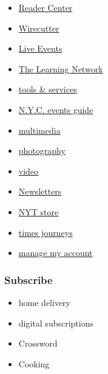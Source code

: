 \begin{itemize}
\tightlist
\item
  \href{https://web.archive.org/web/20200128165017/https://www.nytimes.com/section/reader-center}{Reader
  Center}
\item
  \href{https://web.archive.org/web/20200128165017/https://thewirecutter.com/}{Wirecutter}
\item
  \href{https://web.archive.org/web/20200128165017/http://nytconferences.com/}{Live
  Events}
\item
  \href{https://web.archive.org/web/20200128165017/https://www.nytimes.com/section/learning}{The
  Learning Network}
\item
  \href{https://web.archive.org/web/20200128165017/http://www.nytimes.com/marketing/tools-and-services}{tools
  \& services}
\item
  \href{https://web.archive.org/web/20200128165017/https://www.nytimes.com/spotlight/arts-listings}{N.Y.C.
  events guide}
\item
  \href{https://web.archive.org/web/20200128165017/https://www.nytimes.com/section/multimedia}{multimedia}
\item
  \href{https://web.archive.org/web/20200128165017/https://www.nytimes.com/section/lens}{photography}
\item
  \href{https://web.archive.org/web/20200128165017/https://www.nytimes.com/video}{video}
\item
  \href{https://web.archive.org/web/20200128165017/https://www.nytimes.com/newsletters}{Newsletters}
\item
  \href{https://web.archive.org/web/20200128165017/https://store.nytimes.com/}{NYT
  store}
\item
  \href{https://web.archive.org/web/20200128165017/https://www.nytimes.com/times-journeys}{times
  journeys}
\item
  \href{https://web.archive.org/web/20200128165017/https://account.nytimes.com/}{manage
  my account}
\end{itemize}

\hypertarget{subscribe}{%
\subsubsection{Subscribe}\label{subscribe}}

\begin{itemize}
\tightlist
\item
  home delivery
\item
  digital subscriptions
\item
  Crossword
\item
  Cooking
\end{itemize}

